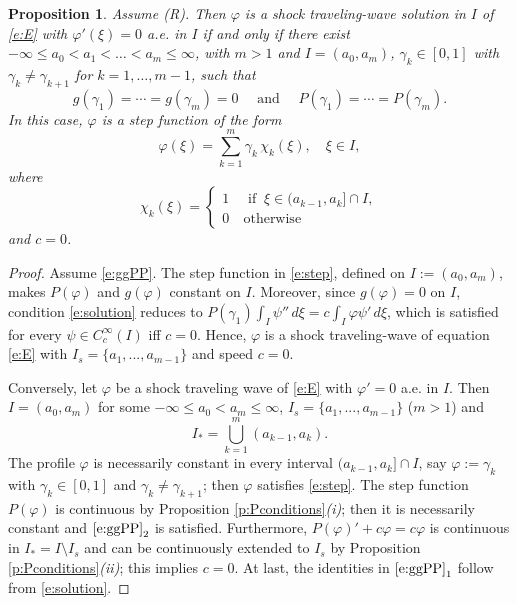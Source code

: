 \documentclass[11pt,a4paper]{article}
\newtheorem{proposition}{Proposition}[section]
\renewcommand{\phi}{\varphi}
\begin{document}
\begin{proposition}\label{p:tratti}  Assume {\rm (R)}. Then $\phi $ is a shock traveling-wave solution in $I$ of \eqref{e:E} with $\phi'(\xi) = 0$ a.e.\! in $I$ if and only if there exist $-\infty\le a_0<a_1<\ldots<a_m\le \infty$, with $m>1$ and $I=(a_0, a_m)$, $\gamma_k\in [0,1]$ with $\gamma_k\ne \gamma_{k+1}$ for $k=1,\ldots,m-1$, such that 
\begin{equation}\label{e:ggPP}
g(\gamma_1)=\cdots =g(\gamma_m)=0
\quad \mbox{ and } \quad 
P(\gamma_1)=\cdots=P(\gamma_m).
\end{equation}
In this case, $\phi$ is a step function of the form
\begin{equation}\label{e:step}
\phi(\xi)
= \sum_{k=1}^{m} \gamma_k \, \chi_{k}(\xi), \quad  \xi\in I, 
\end{equation}
where \begin{equation*} \chi_k(\xi)=\begin{cases} 1 \ &\mbox{ if } \ \xi \in (a_{k-1},a_k]\cap I,
\\ 
0 \ &\mbox{otherwise}
\end{cases}
\end{equation*}
and  $c=0$.
\end{proposition}
%
\begin{proof}
Assume \eqref{e:ggPP}. The step function in \eqref{e:step}, defined on $I:=(a_0, a_m)$, makes $P(\phi)$ and  $g(\phi)$ constant on $I$. Moreover, since  $g(\phi)=0$ on $I$, condition \eqref{e:solution} reduces to $P(\gamma_1)\int_I \psi'' \, d\xi=c\int_I\phi \psi' \, d\xi$, which is satisfied for every $\psi\in C_c^\infty(I)$ iff $c=0$. Hence, $\phi$ is a shock traveling-wave of equation \eqref{e:E} with $I_{s}= \{a_1, ..., a_{m-1}\}$ and speed $c=0$.

Conversely, let $\phi$ be a shock traveling wave  of \eqref{e:E} with $\phi'=0$ a.e.\! in $I$. Then $I=(a_0,a_m)$ for some $-\infty\le a_0<a_m\le \infty$, $I_{s}=\{a_1, ..., a_{m-1}\}$ ($m>1$) and
\[
I_*=\displaystyle \bigcup_{k=1}^{m} (a_{k-1}, a_k).
\] 
The profile $\phi$ is necessarily constant in every interval  $(a_{k-1}, a_k]\cap I$, say $\phi:=\gamma_k$ with $\gamma_k \in [0,1]$ and $\gamma_k \ne \gamma_{k+1}$; then $\phi$ satisfies \eqref{e:step}. The step function $P(\phi)$ is continuous by Proposition \ref{p:Pconditions}{\em (i)}; then it is necessarily constant and $\eqref{e:ggPP}_2$ is satisfied. Furthermore, $P(\phi)'+c\phi=c\phi$ is continuous in $I_*=I\setminus I_s$ and can be continuously extended  to $I_s$ by Proposition \ref{p:Pconditions}{\em (ii)}; this implies $c=0$.  At last, the identities in $\eqref{e:ggPP}_1$ follow from \eqref{e:solution}.
\end{proof}
\end{document}
